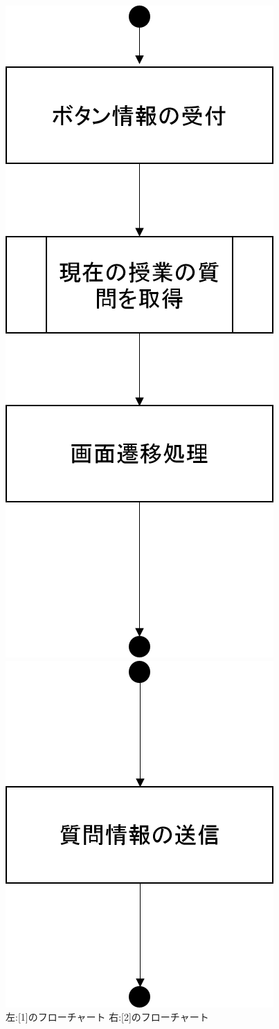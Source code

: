 \begin{figure}[htbp]
 \begin{minipage}{0.5\hsize}
  \begin{center}
   \includegraphics[width=0.45\linewidth,clip]{./img/q_read/sub1.png}
  \end{center}
 \end{minipage}
 \begin{minipage}{0.5\hsize}
  \begin{center}
   \includegraphics[width=0.45\linewidth,clip]{./img/q_read/sub2.png}
  \end{center}
 \end{minipage}
 \caption{左:[1]のフローチャート 右:[2]のフローチャート}\label{fig:qreadflow0}
\end{figure}

